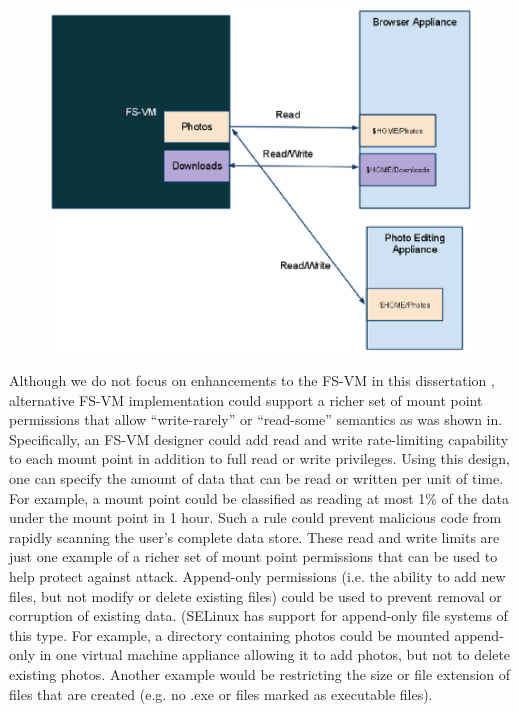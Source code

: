 \begin{figure}[tbp]
\begin{centering}
\label{fig:FS-VM-Architecture}
\includegraphics[scale=0.9,angle=90]{figs/FS-VM-Architecture}
\end{centering} 
\end{figure}


Although we do not focus on enhancements to the FS-VM in this dissertation , alternative FS-VM implementation could support a richer set of mount point permissions that allow ``write-rarely'' or ``read-some'' semantics as was shown in\cite{rapid_recovery_paper_05}. Specifically, an FS-VM designer could add read and write rate-limiting capability to each mount point in addition to full read or write privileges. Using this design, one can specify the amount of data that can be read or written per unit of time. For example, a mount point could be classified as reading at most 1\% of the data under the mount point in 1 hour. Such a rule could prevent malicious code from rapidly scanning the user's complete data store. These read and write limits are just one example of a richer set of mount point permissions that can be used to help protect against attack. Append-only permissions (i.e. the ability to add new files, but not modify or delete existing files) could be used to prevent removal or corruption of existing data. (SELinux has support for append-only file systems of this type\cite{smalley_2001}. For example, a directory containing photos could be mounted append-only in one virtual machine appliance allowing it to add photos, but not to delete existing photos. Another example would be restricting the size or file extension of files that are created (e.g. no .exe or files marked as executable files).

